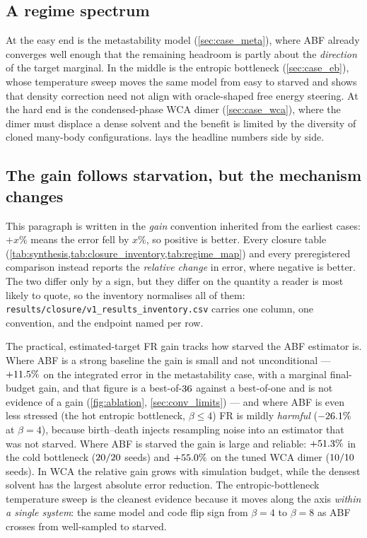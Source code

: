 \subsection{A regime spectrum}
At the easy end is the metastability model (\cref{sec:case_meta}), where ABF
already converges well enough that the remaining headroom is partly about the
\emph{direction} of the target marginal. In the middle is the entropic bottleneck
(\cref{sec:case_eb}), whose temperature sweep moves the same model from easy to
starved and shows that density correction need not align with oracle-shaped free
energy steering. At the hard end is the condensed-phase WCA dimer
(\cref{sec:case_wca}), where the dimer must displace a dense solvent and the
benefit is limited by the diversity of cloned many-body configurations.
 lays the headline numbers side by side.



\subsection{The gain follows starvation, but the mechanism changes}
\begin{remark}
\label{rem:sign_convention}
This paragraph is written in the \emph{gain} convention inherited from the earliest cases:
$+x\%$ means the error fell by $x\%$, so positive is better. Every closure table
(\cref{tab:synthesis,tab:closure_inventory,tab:regime_map}) and every preregistered
comparison instead reports the \emph{relative change} in error, where negative is better.
The two differ only by a sign, but they differ on the quantity a reader is most likely to
quote, so the inventory normalises all of them:
\texttt{results/closure/v1\_results\_inventory.csv} carries one column, one convention, and
the endpoint named per row.
\end{remark}

The practical, estimated-target FR gain tracks how starved the ABF estimator is.
Where ABF is a strong baseline the gain is small and not unconditional ---
$+11.5\%$ on the integrated error in the metastability case, with a
marginal final-budget gain, and that figure is a best-of-$36$ against a
best-of-one and is not evidence of a gain (\cref{fig:ablation}, \cref{sec:conv_limits})
--- and where ABF is
even less stressed (the hot
entropic bottleneck, $\beta\le4$) FR is mildly \emph{harmful}
($-26.1\%$ at $\beta=4$), because birth--death injects resampling
noise into an estimator that was not starved. Where ABF is starved the gain is
large and reliable: $+51.3\%$ in the cold bottleneck ($20/20$
seeds) and $+55.0\%$ on the tuned WCA dimer ($10/10$ seeds).
In WCA the relative gain grows with simulation budget, while the densest solvent
has the largest absolute error reduction. The entropic-bottleneck temperature
sweep is the cleanest evidence because it moves along the axis \emph{within a
single system}: the same model and code flip sign from $\beta=4$ to $\beta=8$ as
ABF crosses from well-sampled to starved.

